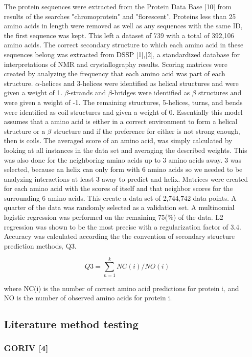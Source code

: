 \documentclass{article}
\begin{document}
The protein sequences were extracted from the Protein Data Base [10] from results of the searches "chromoprotein" and "florescent". Proteins less than 25 amino acids in length were removed as well as any sequences with the same ID, the first sequence was kept. This left a dataset of 739 with a total of 392,106 amino acids. The correct secondary structure to which each amino acid in these sequences belong was extracted from DSSP [1],[2], a standardized database for interpretations of NMR and crystallography results. Scoring matrices were created by analyzing the frequency that each amino acid was part of each structure. $\alpha$-helices and 3-helices were identified as helical structures and were given a weight of 1. $\beta$-strands and $\beta$-bridges were identified as $\beta$ structures and were given a weight of -1. The remaining structures, 5-helices, turns, and bends were identified as coil structures and given a weight of 0. Essentially this model assumes that a amino acid is either in a correct environment to form a helical structure or a $\beta$ structure and if the preference for either is not strong enough, then is coils. The averaged score of an amino acid, was simply calculated by looking at all instances in the data set and averaging the described weights. This was also done for the neighboring amino acids up to 3 amino acids away. 3 was selected, because an helix can only form with 6 amino acids so we needed to be analyzing interactions at least 3 away to predict and helix. Matrices were created for each amino acid with the scores of itself and that neighbor scores for the surrounding 6 amino acids. This create a data set of 2,744,742 data points. A quarter of the data was randomly selected as a validation set. A multinomial logistic regression was performed on the remaining 75(\%) of the data. L2 regression was shown to be the most precise with a regularization factor of 3.4. Accuracy was calculated according the the convention of secondary structure prediction methods, Q3.

$$Q3=\sum_{n=1}^{k} NC(i)/NO(i) $$

where NC(i) is the number of correct amino acid predictions for protein i, and NO is the number of observed amino acids for protein i.

\subsection{Literature method testing}

\subsubsection{GORIV [4]}
\end{document}
